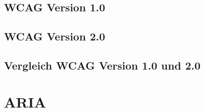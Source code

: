 \documentclass[a4paper,bibtotoc,oneside]{scrbook}
\begin{document}
\section[Erster Abschnitt]{WCAG Version 1.0}

\section[Zweiter Abschnitt]{WCAG Version 2.0}

\section[Zweiter Abschnitt]{Vergleich WCAG Version 1.0 und 2.0}

\chapter[Drittes Kapitel]{ARIA}









\end{document}
